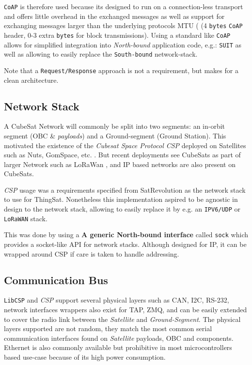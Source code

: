 \texttt{CoAP} is therefore used because its designed to run on a connection-less transport
and offers little overhead in the exchanged messages as well as support for exchanging
messages larger than the underlying protocols MTU (
(4 \texttt{bytes} \texttt{CoAP} header, 0-3 extra \texttt{bytes} for block transmissions).
Using a standard like \texttt{CoAP} allows for simplified integration into \textit{North-bound}
application code, e.g.: \texttt{SUIT} as well as allowing to easily replace the
\texttt{South-bound} network-stack.

Note that a \texttt{Request/Response} approach is not a requirement, but makes
for a clean architecture.

\subsection{Network Stack}

A CubeSat Network will commonly be split into two segments: an in-orbit segment
(OBC \& \textit{payloads}) and a Ground-segment (Ground Station). This motivated
the existence of the \textit{Cubesat Space Protocol CSP} deployed on Satellites
such as Nuts, GomSpace, etc. . But recent deployments see CubeSats
as part of larger Network such as LoRaWan , and IP based
networks are also present on CubeSats.

\textit{CSP} usage was a requirements specified from SatRevolution as the network
stack to use for ThingSat. Nonetheless this implementation aspired to be agnostic
in design to the network stack, allowing to easily replace it by e.g. an
\texttt{IPV6/UDP} or \texttt{LoRaWAN} stack.

This was done by using a {\bf A generic North-bound interface} called \texttt{sock}
which provides a socket-like API for network stacks. Although designed for IP,
it can be wrapped around CSP if care is taken to handle addressing.

\subsection{Communication Bus}

\texttt{LibCSP} and \textit{CSP} support several physical layers such as CAN, I2C,
RS-232, network interfaces wrappers also exist for TAP, ZMQ, and can be easily
extended to cover the radio link between the \textit{Satellite} and
\textit{Ground-Segment}. The physical layers supported are not random, they match
the most common serial communication interfaces found on \textit{Satellite}
payloads, OBC and components. Ethernet is also commonly available  but prohibitive
in most microcontrollers based use-case because of its high power consumption.

